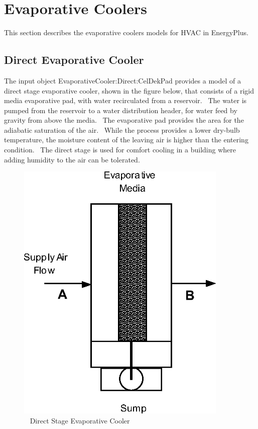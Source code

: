 \section{Evaporative Coolers }\label{evaporative-coolers}

This section describes the evaporative coolers models for HVAC in EnergyPlus.

\subsection{Direct Evaporative Cooler}\label{direct-evaporative-cooler}

The input object EvaporativeCooler:Direct:CelDekPad provides a model of a direct stage evaporative cooler, shown in the figure below, that consists of a rigid media evaporative pad, with water recirculated from a reservoir.~ The water is pumped from the reservoir to a water distribution header, for water feed by gravity from above the media.~ The evaporative pad provides the area for the adiabatic saturation of the air.~ While the process provides a lower dry-bulb temperature, the moisture content of the leaving air is higher than the entering condition.~ The direct stage is used for comfort cooling in a building where adding humidity to the air can be tolerated.

\begin{figure}[hbtp] %
\centering
\includegraphics[width=0.9\textwidth, height=0.9\textheight, keepaspectratio=true]{media/image4789.png}
\caption{  Direct Stage Evaporative Cooler \protect \label{fig:direct-stage-evaporative-cooler}}
\end{figure}

